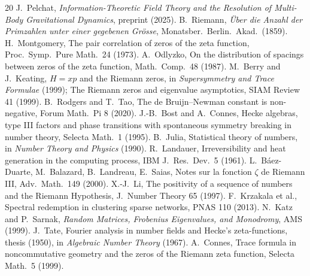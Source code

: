 \documentclass[11pt]{article}
\begin{document}
\begin{thebibliography}{20}\small
{} J.~Pelchat, \emph{Information-Theoretic Field Theory and the Resolution of
Multi-Body Gravitational Dynamics}, preprint (2025).
 B.~Riemann, \emph{\"Uber die Anzahl der Primzahlen unter einer gegebenen
Gr\"osse}, Monatsber.\ Berlin.\ Akad.\ (1859).
 H.~Montgomery, The pair correlation of zeros of the zeta function,
Proc.\ Symp.\ Pure Math.\ 24 (1973).
 A.~Odlyzko, On the distribution of spacings between zeros of the zeta function,
Math.\ Comp.\ 48 (1987).
 M.~Berry and J.~Keating, $H=xp$ and the Riemann zeros, in
\emph{Supersymmetry and Trace Formulae} (1999); The Riemann zeros and eigenvalue asymptotics,
SIAM Review 41 (1999).
 B.~Rodgers and T.~Tao, The de Bruijn--Newman constant is non-negative,
Forum Math.\ Pi 8 (2020).
 J.-B.~Bost and A.~Connes, Hecke algebras, type III factors and phase
transitions with spontaneous symmetry breaking in number theory, Selecta Math.\ 1 (1995).
 B.~Julia, Statistical theory of numbers, in \emph{Number Theory and Physics}
(1990).
 R.~Landauer, Irreversibility and heat generation in the computing process,
IBM J.\ Res.\ Dev.\ 5 (1961).
 L.~B\'aez-Duarte, M.~Balazard, B.~Landreau, E.~Saias, Notes sur la fonction
$\zeta$ de Riemann III, Adv.\ Math.\ 149 (2000).
 X.-J.~Li, The positivity of a sequence of numbers and the Riemann Hypothesis,
J.\ Number Theory 65 (1997).
 F.~Krzakala et al., Spectral redemption in clustering sparse networks,
PNAS 110 (2013).
 N.~Katz and P.~Sarnak, \emph{Random Matrices, Frobenius Eigenvalues, and
Monodromy}, AMS (1999).
 J.~Tate, Fourier analysis in number fields and Hecke's zeta-functions, thesis
(1950), in \emph{Algebraic Number Theory} (1967).
 A.~Connes, Trace formula in noncommutative geometry and the zeros of the Riemann
zeta function, Selecta Math.\ 5 (1999).
\end{thebibliography}
\end{document}
